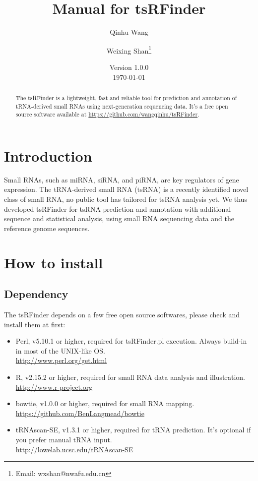 \documentclass[11pt, a4paper]{article}
\title{Manual for tsRFinder}
\author{Qinhu Wang}
\author{Weixing Shan\thanks{Email: wxshan@nwafu.edu.cn}}
\affil{Northwest A\&F University}
\date{Version 1.0.0\\[3pt] \today}
\begin{document}
\maketitle

\begin{abstract}
The tsRFinder is a lightweight, fast and reliable tool for prediction and annotation of tRNA-derived small RNAs using next-generation sequencing data. It's a free open source software available at \url{https://github.com/wangqinhu/tsRFinder}.
\end{abstract}

\clearpage

\tableofcontents

\clearpage

\section{Introduction}

Small RNAs, such as miRNA, siRNA, and piRNA, are key regulators of gene expression. The tRNA-derived small RNA (tsRNA) is a recently identified novel class of small RNA, no public tool has tailored for tsRNA analysis yet. We thus developed tsRFinder for tsRNA prediction and annotation with additional sequence and statistical analysis, using small RNA sequencing data and the reference genome sequences.

\section{How to install}

\subsection{Dependency}

The tsRFinder depends on a few free open source softwares, please check and install them at first:

\begin{itemize}

\item Perl, v5.10.1 or higher, required for tsRFinder.pl execution. Always build-in in most of the UNIX-like OS. \\\url{http://www.perl.org/get.html}
\item R, v2.15.2 or higher, required for small RNA data analysis and illustration. \\\url{http://www.r-project.org}
\item bowtie, v1.0.0 or higher, required for small RNA mapping. \\\url{https://github.com/BenLangmead/bowtie}
\item tRNAscan-SE, v1.3.1 or higher, required for tRNA prediction. It's optional if you prefer manual tRNA input. \\\url{http://lowelab.ucsc.edu/tRNAscan-SE}

\end{itemize}
\end{document}

